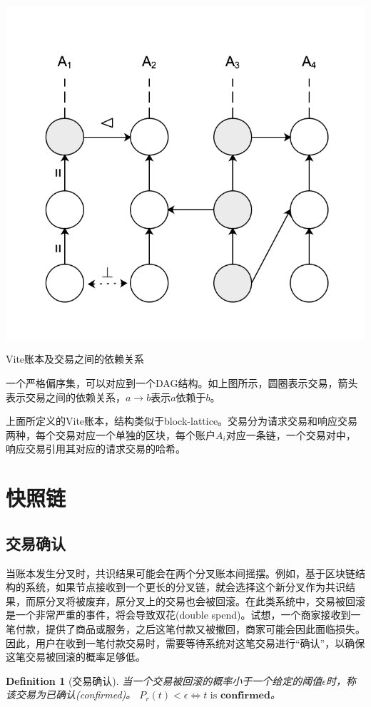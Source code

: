 \documentclass[UTF8,nofonts]{ctexart}
\makeatletter
\newtheorem{definition}{Definition}[section]
\newenvironment{figurehere}
 {\def\@captype{figure}}
 {}
\makeatother
\begin{document}
\begin{multicols}{2}
\begin{center}
\begin{figurehere}
\includegraphics[width=.7\linewidth]{image/ledger.png}
\caption{Vite账本及交易之间的依赖关系}
\end{figurehere}
\end{center}

一个严格偏序集，可以对应到一个DAG结构。如上图所示，圆圈表示交易，箭头表示交易之间的依赖关系，$a \rightarrow b$表示$a$依赖于$b$。

上面所定义的Vite账本，结构类似于block-lattice。交易分为请求交易和响应交易两种，每个交易对应一个单独的区块，每个账户$A_{i}$对应一条链，一个交易对中，响应交易引用其对应的请求交易的哈希。

\section{快照链}
\subsection{交易确认}
当账本发生分叉时，共识结果可能会在两个分叉账本间摇摆。例如，基于区块链结构的系统，如果节点接收到一个更长的分叉链，就会选择这个新分叉作为共识结果，而原分叉将被废弃，原分叉上的交易也会被回滚。在此类系统中，交易被回滚是一个非常严重的事件，将会导致双花(double spend)。试想，一个商家接收到一笔付款，提供了商品或服务，之后这笔付款又被撤回，商家可能会因此面临损失。因此，用户在收到一笔付款交易时，需要等待系统对这笔交易进行“确认”，以确保这笔交易被回滚的概率足够低。

\begin{definition}[交易确认]
当一个交易被回滚的概率小于一个给定的阈值$\epsilon$时，称该交易为已确认(confirmed)。
$P_{r}(t) < \epsilon \Leftrightarrow t \text{ is } \boldsymbol{confirmed}$。
\end{definition}


\end{multicols}
\end{document}
